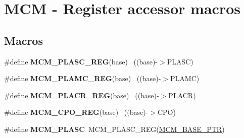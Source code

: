 \hypertarget{group___m_c_m___register___accessor___macros}{}\section{M\+C\+M -\/ Register accessor macros}
\label{group___m_c_m___register___accessor___macros}
\subsection*{Macros}
\begin{DoxyCompactItemize}
\item 
\hypertarget{group___m_c_m___register___accessor___macros_gad331cc7eeaf62bb3d0fc388993df2a8f}{}\#define {\bfseries M\+C\+M\+\_\+\+P\+L\+A\+S\+C\+\_\+\+R\+E\+G}(base)                                        ~((base)-\/$>$P\+L\+A\+S\+C)\label{group___m_c_m___register___accessor___macros_gad331cc7eeaf62bb3d0fc388993df2a8f}

\item 
\hypertarget{group___m_c_m___register___accessor___macros_ga56804c4b9f516c18d994d033cae1dc30}{}\#define {\bfseries M\+C\+M\+\_\+\+P\+L\+A\+M\+C\+\_\+\+R\+E\+G}(base)                                        ~((base)-\/$>$P\+L\+A\+M\+C)\label{group___m_c_m___register___accessor___macros_ga56804c4b9f516c18d994d033cae1dc30}

\item 
\hypertarget{group___m_c_m___register___accessor___macros_ga17a3e9a89a16aa68153508ea00f5cbf5}{}\#define {\bfseries M\+C\+M\+\_\+\+P\+L\+A\+C\+R\+\_\+\+R\+E\+G}(base)                                        ~((base)-\/$>$P\+L\+A\+C\+R)\label{group___m_c_m___register___accessor___macros_ga17a3e9a89a16aa68153508ea00f5cbf5}

\item 
\hypertarget{group___m_c_m___register___accessor___macros_ga80926cfb869ed402f949b05fc8edf56a}{}\#define {\bfseries M\+C\+M\+\_\+\+C\+P\+O\+\_\+\+R\+E\+G}(base)                                            ~((base)-\/$>$C\+P\+O)\label{group___m_c_m___register___accessor___macros_ga80926cfb869ed402f949b05fc8edf56a}

\item 
\hypertarget{group___m_c_m___register___accessor___macros_ga1741cb7cdef46052c2ac9e7d28fb2b53}{}\#define {\bfseries M\+C\+M\+\_\+\+P\+L\+A\+S\+C}~M\+C\+M\+\_\+\+P\+L\+A\+S\+C\+\_\+\+R\+E\+G(\hyperlink{group___m_c_m___peripheral_gad41e931f176c230831e3dbad45117841}{M\+C\+M\+\_\+\+B\+A\+S\+E\+\_\+\+P\+T\+R})\label{group___m_c_m___register___accessor___macros_ga1741cb7cdef46052c2ac9e7d28fb2b53}


\end{DoxyCompactItemize}
